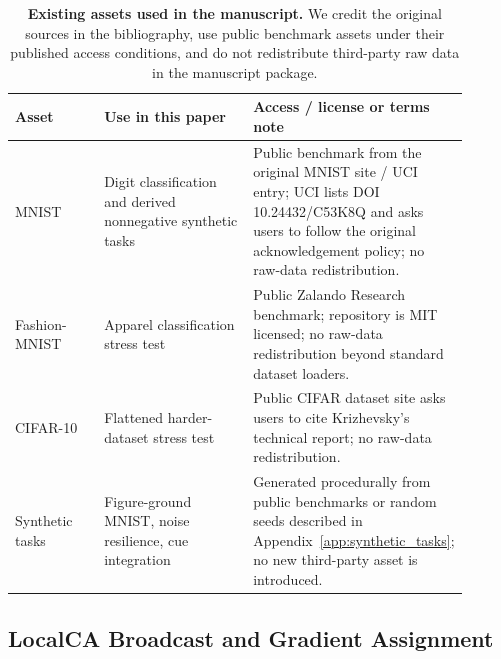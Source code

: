     \begin{table}[htbp]
    \centering
    \small
    \setlength{\tabcolsep}{4pt}
    \begin{tabular}{@{}L{0.20\linewidth}L{0.34\linewidth}L{0.36\linewidth}@{}}
    \toprule
    \textbf{Asset} & \textbf{Use in this paper} & \textbf{Access / license or terms note} \\
    \midrule
    MNIST & Digit classification and derived nonnegative synthetic tasks & Public benchmark from the original MNIST site / UCI entry; UCI lists DOI 10.24432/C53K8Q and asks users to follow the original acknowledgement policy; no raw-data redistribution. \\
    Fashion-MNIST & Apparel classification stress test & Public Zalando Research benchmark; repository is MIT licensed; no raw-data redistribution beyond standard dataset loaders. \\
    CIFAR-10 & Flattened harder-dataset stress test & Public CIFAR dataset site asks users to cite Krizhevsky's technical report; no raw-data redistribution. \\
    Synthetic tasks & Figure-ground MNIST, noise resilience, cue integration & Generated procedurally from public benchmarks or random seeds described in Appendix~\ref{app:synthetic_tasks}; no new third-party asset is introduced. \\
    \bottomrule
    \end{tabular}
    \caption{\textbf{Existing assets used in the manuscript.} We credit the original sources in the bibliography, use public benchmark assets under their published access conditions, and do not redistribute third-party raw data in the manuscript package.}
    \end{table}
    
    \subsection{LocalCA Broadcast and Gradient Assignment}
    
